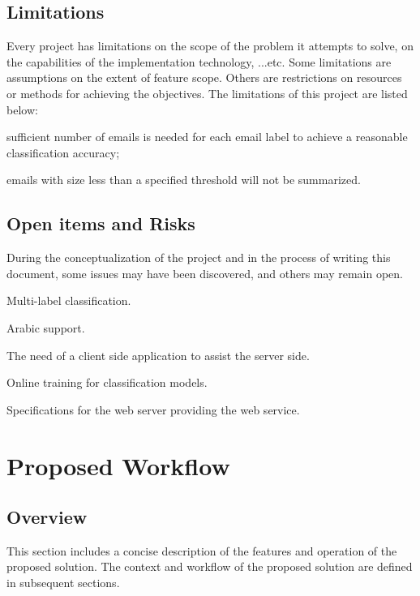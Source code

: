 \documentclass[a4paper,10pt]{article}
\newenvironment{my_itemize}
{\begin{itemize}
  \setlength{\itemsep}{0cm}
  \setlength{\parskip}{0cm}}
{\end{itemize}}
\begin{document}
\subsection{Limitations}
Every project has limitations on the scope of the problem it attempts to solve, 
on the capabilities of the implementation technology, ...etc. Some limitations 
are assumptions on the extent of feature scope. Others are restrictions on resources 
or methods for achieving the objectives. The limitations of this project are listed below:

\begin{my_itemize}
  \item sufficient number of emails is needed for each email label to achieve 
	a reasonable classification accuracy;
  \item emails with size less than a specified threshold will not be summarized.
\end{my_itemize}

\subsection{Open items and Risks}
During the conceptualization of the project and in the process of writing this document, 
some issues may have been discovered, and others may remain open.
\begin{my_itemize}
  \item Multi-label classification.
  \item Arabic support.
  \item The need of a client side application to assist the server side.
  \item Online training for classification models.
  \item Specifications for the web server providing the web service.
\end{my_itemize}


\newpage
\section{Proposed Workflow}
\subsection{Overview}
This section includes a concise description of the features and operation of the 
proposed solution. The context and workflow of the proposed solution are defined in subsequent sections.
\end{document}
